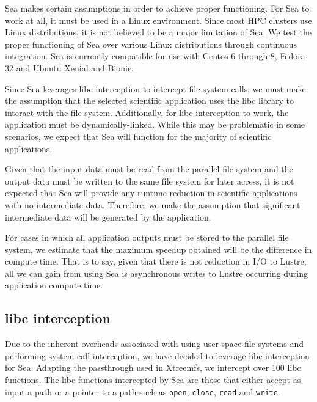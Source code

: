 \documentclass{report}
\begin{document}
   Sea makes certain assumptions in order to achieve proper functioning. For Sea to
   work at all, it must be used in a Linux environment. Since most HPC clusters
   use Linux distributions, it is not believed to be a major limitation of Sea. We test
   the proper functioning of Sea over various Linux distributions through continuous
   integration. Sea is currently compatible for use with Centos 6 through 8, Fedora 32
   and Ubuntu Xenial and Bionic.

   Since Sea leverages libc interception to intercept file system calls, we must
   make the assumption that the selected scientific application uses the libc library
   to interact with the file system. Additionally, for libc interception to work,
   the application must be dynamically-linked. While this may be problematic in some
   scenarios, we expect that Sea will function for the majority of scientific applications.

    Given that the input data must be read from the parallel file system and the
    output data must be written to the same file system for later access, it is
    not expected that Sea will provide any runtime reduction in scientific applications
    with no intermediate data. Therefore, we make the assumption that significant
    intermediate data will be generated by the application.

    For cases in which all application outputs must be stored to the parallel file
    system, we estimate that the maximum speedup obtained will be the difference in
    compute time. That is to say, given that there is not reduction in I/O to Lustre,
    all we can gain from using Sea is asynchronous writes to Lustre occurring during
    application compute time.

   \subsection{libc interception}\label{subs:libcintersection}

   Due to the inherent overheads associated with using user-space file systems and
   performing system call interception, we have decided to leverage libc interception
   for Sea. Adapting the passthrough used in Xtreemfs, we intercept over 100 libc functions.
   The libc functions intercepted by Sea are those that either accept as input a path
   or a pointer to a path such as \texttt{open}, \texttt{close}, \texttt{read} and \texttt{write}.
\end{document}
